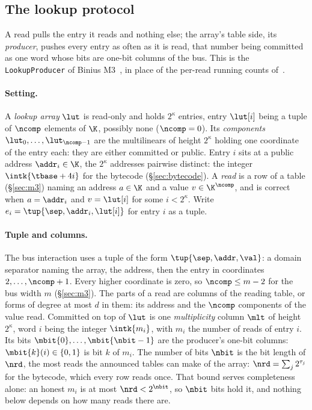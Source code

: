 \subsection{The lookup protocol}\label{sec:lookup}

A read pulls the entry it reads and nothing else; the array's table side, its \emph{producer}, pushes every entry as often as it is read, that number being committed as one word whose bits are one-bit columns of the bus. This is the \texttt{LookupProducer} of Binius M3~\cite{m3}, in place of the per-read running counts of~\cite[Protocol~4.27]{DP23}.

\paragraph{Setting.} A \emph{lookup array} $\lut$ is read-only and holds $2^{\kappa}$ entries, entry $\lut[i]$ being a tuple of $\ncomp$ elements of $\K$, possibly none ($\ncomp=0$). Its \emph{components} $\lut_0,\dots,\lut_{\ncomp-1}$ are the multilinears of height $2^{\kappa}$ holding one coordinate of the entry each: they are either committed or public. Entry $i$ sits at a public address $\addr_i\in\K$, the $2^{\kappa}$ addresses pairwise distinct: the integer $\intk{\tbase+4i}$ for the bytecode (\S\ref{sec:bytecode}). A \emph{read} is a row of a table (\S\ref{sec:m3}) naming an address $a\in\K$ and a value $v\in\K^{\ncomp}$, and is correct when $a=\addr_i$ and $v=\lut[i]$ for some $i<2^{\kappa}$. Write $e_i=\tup{\sep,\addr_i,\lut[i]}$ for entry $i$ as a tuple.

\paragraph{Tuple and columns.} The bus interaction uses a tuple of the form $\tup{\sep,\addr,\val}$: a domain separator naming the array, the address, then the entry in coordinates $2,\dots,\ncomp+1$. Every higher coordinate is zero, so $\ncomp\le m-2$ for the bus width $m$ (\S\ref{sec:m3}). The parts of a read are columns of the reading table, or forms of degree at most $d$ in them: its address and the $\ncomp$ components of the value read. Committed on top of $\lut$ is one \emph{multiplicity} column $\mlt$ of height $2^{\kappa}$, word $i$ being the integer $\intk{m_i}$, with $m_i$ the number of reads of entry $i$. Its bits $\mbit{0},\dots,\mbit{\nbit-1}$ are the producer's one-bit columns: $\mbit{k}(i)\in\{0,1\}$ is bit $k$ of $m_i$. The number of bits $\nbit$ is the bit length of $\nrd$, the most reads the announced tables can make of the array: $\nrd=\sum_j2^{\tau_j}$ for the bytecode, which every row reads once. That bound serves completeness alone: an honest $m_i$ is at most $\nrd<2^{\nbit}$, so $\nbit$ bits hold it, and nothing below depends on how many reads there are.

